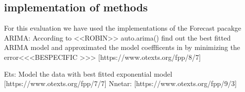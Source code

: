 \subsection{implementation of methods}
For this evaluation we have used the implementations of the Forecast pacakge \cite{forecastPackage}
ARIMA: According to <<ROBIN>> auto.arima()  find out the best fitted ARIMA model and approximated the model coeffficents in by minimizing the error<<<BESPECIFIC >>> [https://www.otexts.org/fpp/8/7]

Ets: Model the data with best fitted exponential model [https://www.otexts.org/fpp/7/7]
    \cite{Wagner_2011}
	Nnetar: [https://www.otexts.org/fpp/9/3]
